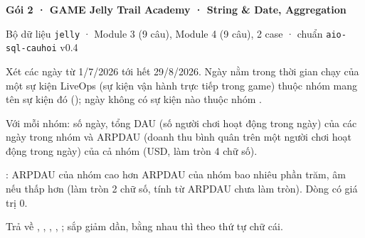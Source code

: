 \documentclass[11pt,a4paper]{article}
\begin{document}
{\LARGE\bfseries Gói 2 · GAME Jelly Trail Academy · String \& Date, Aggregation\par}
\medskip
{\color{cqMuted}Bộ dữ liệu \texttt{jelly} · Module 3 (9 câu), Module 4 (9 câu), 2 case · chuẩn \texttt{aio-sql-cauhoi} v0.4\par}
\tableofcontents



\begin{cauhoi}[ma=jelly-s1-arpdau-ngay-su-kien, dulieu=jelly, domain=marketing,
  hinhthuc=write, cap=hard, dang=C3, kynang={nối theo khoảng ngày, LEFT JOIN, CTE, tỷ lệ của tổng}, bay={bo-ngay-ket-thuc, trung-binh-arpdau-ngay, quen-can-tren, gan-cung-lich-su-kien},
  tacgia={Agent gói 2}, trangthai=review, bokiemtra={public, hidden-1}, thutu=co, saiso=0.0001]
\begin{yeucau}
  \item Xét các ngày từ 1/7/2026 tới hết 29/8/2026. Ngày nằm trong thời gian chạy của một sự kiện LiveOps (sự kiện vận hành trực tiếp trong game) thuộc nhóm mang tên sự kiện đó (); ngày không có sự kiện nào thuộc nhóm .
  \item Với mỗi nhóm: số ngày, tổng DAU (số người chơi hoạt động trong ngày) của các ngày trong nhóm và ARPDAU (doanh thu bình quân trên một người chơi hoạt động trong ngày) của cả nhóm (USD, làm tròn 4 chữ số).
  \item {}: ARPDAU của nhóm cao hơn ARPDAU của nhóm  bao nhiêu phần trăm, âm nếu thấp hơn (làm tròn 2 chữ số, tính từ ARPDAU chưa làm tròn). Dòng  có giá trị 0.
  \item Trả về , , , , ; sắp  giảm dần, bằng nhau thì  theo thứ tự chữ cái.
\end{yeucau}
\begin{erd}

\end{erd}
\end{cauhoi}
\end{document}
